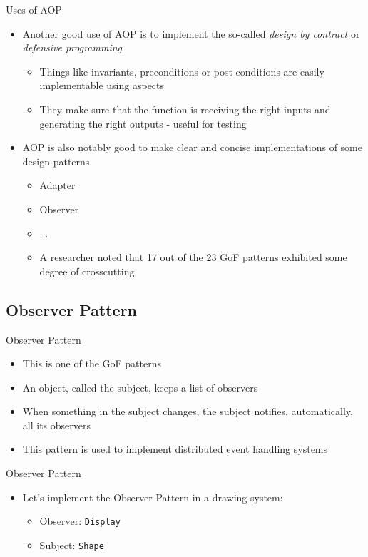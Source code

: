 \documentclass[11pt]{beamer}
\begin{document}
\begin{frame}{Uses of AOP}
\begin{itemize}
   \item Another good use of AOP is to implement the so-called \emph{design by contract} or \emph{defensive programming}
   \begin{itemize}
      \item Things like invariants, preconditions or post conditions are easily implementable using aspects
      \item They make sure that the function is receiving the right inputs and generating the right outputs - useful for testing
   \end{itemize}
   \item AOP is also notably good to make clear and concise implementations of some design patterns
      \begin{itemize}
         \item Adapter
         \item Observer
         \item ...
         \item A researcher noted that 17 out of the 23 GoF patterns exhibited some degree of crosscutting %
      \end{itemize}
\end{itemize}
\end{frame}

\subsection*{Observer Pattern}
\begin{frame}{Observer Pattern}
\begin{itemize}
   \item This is one of the GoF patterns
   \item An object, called the subject, keeps a list of observers
   \item When something in the subject changes, the subject notifies, automatically, all its observers
   \item This pattern is used to implement distributed event handling systems
\end{itemize}
\end{frame}

\begin{frame}{Observer Pattern}
\begin{itemize}
   \item Let's implement the Observer Pattern in a drawing system:
      \begin{itemize}
         \item Observer: \texttt{Display}
         \item Subject: \texttt{Shape}
      \end{itemize}
\end{itemize}
\end{frame}
\end{document}
